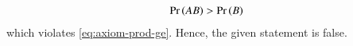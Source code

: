 \begin{align}
\Pr\left(AB\right) > \Pr\left(B\right) 
\end{align}        
which violates
	\eqref{eq:axiom-prod-ge}.
Hence, the given statement is false.

